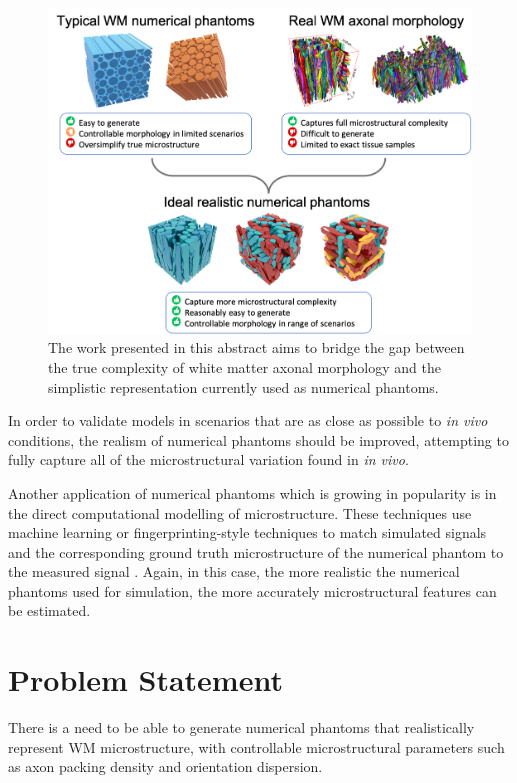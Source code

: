\begin{figure}
  \centering
  \includegraphics[width=\textwidth]{figures/introduction/overview}
  \caption[Overview of the main goal of the thesis]{The work presented in this abstract aims to bridge the gap between the true complexity of white matter axonal morphology and the simplistic representation currently used as numerical phantoms. }
  \label{fig:intro_overview}
\end{figure}

In order to validate models in scenarios that are as close as possible to \emph{in vivo} conditions, the realism of numerical phantoms should be improved, attempting to fully capture all of the microstructural variation found in \emph{in vivo}.

Another application of numerical phantoms which is growing in popularity is in the direct computational modelling of microstructure.
These techniques use machine learning or fingerprinting-style techniques to match simulated signals and the corresponding ground truth microstructure of the numerical phantom to the measured signal \cite{Rensonnet2018,Hill2018,Palombo2018a,Nedjati-Gilani2017}.
Again, in this case, the more realistic the numerical phantoms used for simulation, the more accurately microstructural features can be estimated. 

\section{Problem Statement}
\label{sec:intro_problem_statement}
There is a need to be able to generate numerical phantoms that realistically represent \ac{WM} microstructure, with controllable microstructural parameters such as axon packing density and orientation dispersion.


